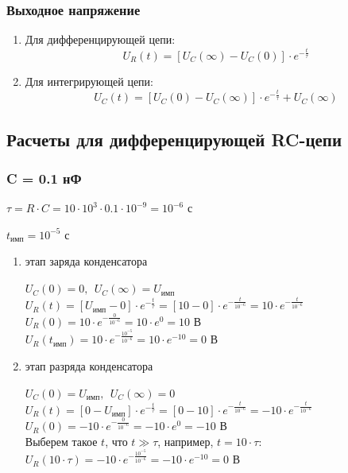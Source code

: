 \subsubsection{Выходное напряжение}

\begin{enumerate}
\item Для дифференцирующей цепи:
	\begin{equation}\label{eq:u_r}
	U_R(t) = [U_C(\infty) - U_C(0)] \cdot e^{-\frac{t}{\tau}}
	\end{equation}

\item Для интегрирующей цепи:
	\begin{equation}\label{eq:u_c}
	U_C(t) = [U_C(0) - U_C(\infty)] \cdot e^{-\frac{t}{\tau}} + U_C(\infty)
	\end{equation}
\end{enumerate}

\subsection{Расчеты для дифференцирующей RC-цепи}

\subsubsection{C = 0.1 нФ}

$\tau = R \cdot C = 10 \cdot 10^3 \cdot 0.1 \cdot 10^{-9} = 10^{-6} \text{ с}$

$t_\text{имп} = 10^{-5} \text{ с}$

\renewcommand{\theenumi}{\asbuk{enumi}}	

\begin{enumerate}
\item этап заряда конденсатора

	$U_C(0)	= 0,\ \ U_C(\infty) = U_\text{имп}$\\
	$U_R(t) = [U_\text{имп} - 0] \cdot e^{-\frac{t}{\tau}} = [10 - 0] \cdot e^{-\frac{t}{10^{-6}}} = 10 \cdot e^{-\frac{t}{10^{-6}}}$\\
	$U_R(0) = 10 \cdot e^{-\frac{0}{10^{-6}}} = 10 \cdot e^0 = 10 \text{ В}$\\
	$U_R(t_\text{имп}) = 10 \cdot e^{-\frac{10^{-5}}{10^{-6}}} = 10 \cdot e^{-10} = 0 \text{ В}$

\item этап разряда конденсатора
		
	$U_C(0)	= U_\text{имп},\ \ U_C(\infty) = 0$\\		
	$U_R(t) = [0 - U_\text{имп}] \cdot e^{-\frac{t}{\tau}} = [0 - 10] \cdot e^{-\frac{t}{10^{-6}}} = -10 \cdot e^{-\frac{t}{10^{-6}}}$\\
	$U_R(0) = -10 \cdot e^{-\frac{0}{10^{-6}}} = -10 \cdot e^0 = -10 \text{ В}$\\
	Выберем такое $t$, что $t \gg \tau$, например, $t = 10 \cdot \tau$:\\
	$U_R(10 \cdot \tau) = -10 \cdot e^{-\frac{10^{-5}}{10^{-6}}} = -10 \cdot e^{-10} = 0 \text{ В}$	
\end{enumerate}

